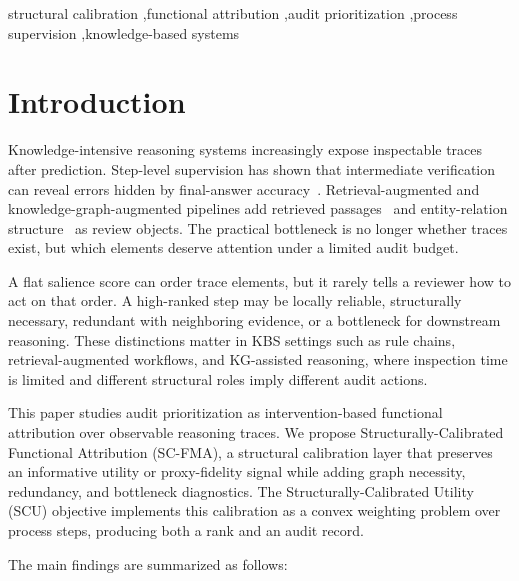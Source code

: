 \documentclass[a4paper,fleqn]{cas-sc}
\begin{document}
\begin{keywords}
structural calibration \sep functional attribution \sep audit prioritization \sep process supervision \sep knowledge-based systems
\end{keywords}

\maketitle

\section{Introduction}

Knowledge-intensive reasoning systems increasingly expose inspectable traces after prediction. Step-level supervision has shown that intermediate verification can reveal errors hidden by final-answer accuracy~\cite{lightman2023verify,uesato2022solving}. Retrieval-augmented and knowledge-graph-augmented pipelines add retrieved passages~\cite{lewis2020rag} and entity-relation structure~\cite{edge2024graphrag} as review objects. The practical bottleneck is no longer whether traces exist, but which elements deserve attention under a limited audit budget.

A flat salience score can order trace elements, but it rarely tells a reviewer how to act on that order. A high-ranked step may be locally reliable, structurally necessary, redundant with neighboring evidence, or a bottleneck for downstream reasoning. These distinctions matter in KBS settings such as rule chains, retrieval-augmented workflows, and KG-assisted reasoning, where inspection time is limited and different structural roles imply different audit actions.

This paper studies audit prioritization as intervention-based functional attribution over observable reasoning traces. We propose Structurally-Calibrated Functional Attribution (SC-FMA), a structural calibration layer that preserves an informative utility or proxy-fidelity signal while adding graph necessity, redundancy, and bottleneck diagnostics. The Structurally-Calibrated Utility (SCU) objective implements this calibration as a convex weighting problem over process steps, producing both a rank and an audit record.

The main findings are summarized as follows:
\end{document}
